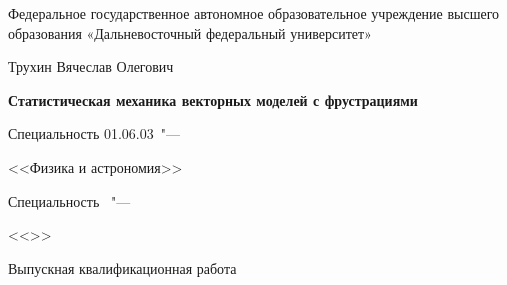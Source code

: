 \thispagestyle{empty}
\begin{center}
	Федеральное государственное автономное образовательное учреждение высшего образования «Дальневосточный федеральный университет»
\end{center}
%
\vspace{0pt plus4fill} %
%
\vspace{0pt plus6fill} %
\begin{center}
	{\large Трухин Вячеслав Олегович}
\end{center}
%
\vspace{0pt plus1fill} %
\begin{center}
	\textbf {\large %
		Статистическая механика векторных моделей с фрустрациями}
	
	\vspace{0pt plus2fill} %
	{%
		Специальность 01.06.03\ "---
		
		<<Физика и астрономия>>
	}
	
	\ifdefined\thesisSpecialtyTwoNumber
	{%
		Специальность \thesisSpecialtyTwoNumber\ "---
		
		<<\thesisSpecialtyTwoTitle>>
	}
	\fi
	
	\vspace{0pt plus2fill} %
	Выпускная квалификационная работа
\end{center}

